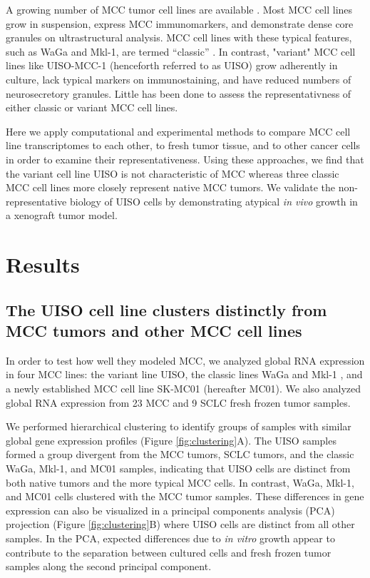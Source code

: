 \documentclass[10pt]{article}
\begin{document}
A growing number of MCC tumor cell lines are available \citep{Krasagakis2001Growth,Leonard1993Characterization,Rosen1987Establishment,Leonard1995Characterisation,Moll1994Establishment,Ronan1993Merkel}.
Most MCC cell lines grow in suspension, express MCC immunomarkers, and demonstrate dense core granules on ultrastructural analysis.
MCC cell lines with these typical features, such as WaGa and Mkl-1, are termed ``classic'' \citep{Ronan1993Merkel,Leonard1993Characterization,VanGele2004Geneexpression}.
In contrast, "variant" MCC cell lines like UISO-MCC-1 (henceforth referred to as UISO) \citep{Ronan1993Merkel} grow adherently in culture, lack typical markers on immunostaining, and have reduced numbers of neurosecretory granules. 
Little has been done to assess the representativness of either classic or variant MCC cell lines. 

Here we apply computational and experimental methods to compare MCC cell line transcriptomes to each other, to fresh tumor tissue, and to other cancer cells in order to examine their representativeness.
Using these approaches, we find that the variant cell line UISO is not characteristic of MCC whereas three classic MCC cell lines more closely represent native MCC tumors. 
We validate the non-representative biology of UISO cells by demonstrating atypical \emph{in vivo} growth in a xenograft tumor model. 

\section*{Results}

\subsection*{The UISO cell line clusters distinctly from MCC tumors and other MCC cell lines}
In order to test how well they modeled MCC, we analyzed global RNA expression in four MCC lines: the variant line UISO, the classic lines WaGa \citep{Houben2010Merkel} and Mkl-1 \citep{Rosen1987Establishment}, and a newly established MCC cell line SK-MC01 (hereafter MC01).
We also analyzed global RNA expression from 23 MCC and 9 SCLC fresh frozen tumor samples.

 We performed hierarchical clustering to identify groups of samples with similar global gene expression profiles (Figure \ref{fig:clustering}A).
The UISO samples formed a group divergent from the MCC tumors, SCLC tumors, and the classic WaGa, Mkl-1, and MC01 samples, indicating that UISO cells are distinct from both native tumors and the more typical MCC cells.
In contrast, WaGa, Mkl-1, and MC01 cells clustered with the MCC tumor samples.
These differences in gene expression can also be visualized in a principal components analysis (PCA) projection (Figure \ref{fig:clustering}B) where UISO cells are distinct from all other samples.
In the PCA, expected differences due to \emph{in vitro} growth appear to contribute to the separation between cultured cells and fresh frozen tumor samples along the second principal component.
\end{document}
